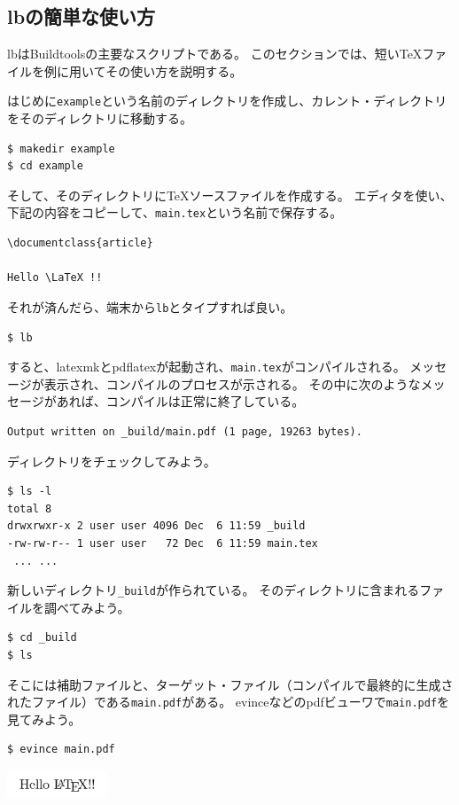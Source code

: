 \subsection{lbの簡単な使い方}
lbはBuildtoolsの主要なスクリプトである。
このセクションでは、短いTeXファイルを例に用いてその使い方を説明する。

はじめに\verb|example|という名前のディレクトリを作成し、カレント・ディレクトリをそのディレクトリに移動する。
\begin{verbatim}
$ makedir example
$ cd example
\end{verbatim}

そして、そのディレクトリにTeXソースファイルを作成する。
エディタを使い、下記の内容をコピーして、\verb|main.tex|という名前で保存する。
\begin{verbatim}
\documentclass{article}

Hello \LaTeX !!

\end{verbatim}

それが済んだら、端末から\verb|lb|とタイプすれば良い。
\begin{verbatim}
$ lb
\end{verbatim}
すると、latexmkとpdflatexが起動され、\verb|main.tex|がコンパイルされる。
メッセージが表示され、コンパイルのプロセスが示される。
その中に次のようなメッセージがあれば、コンパイルは正常に終了している。
\begin{verbatim}
Output written on _build/main.pdf (1 page, 19263 bytes).
\end{verbatim}
ディレクトリをチェックしてみよう。
\begin{verbatim}
$ ls -l
total 8
drwxrwxr-x 2 user user 4096 Dec  6 11:59 _build
-rw-rw-r-- 1 user user   72 Dec  6 11:59 main.tex
 ... ...
\end{verbatim}
新しいディレクトリ\verb|_build|が作られている。
そのディレクトリに含まれるファイルを調べてみよう。
\begin{verbatim}
$ cd _build
$ ls
\end{verbatim}
そこには補助ファイルと、ターゲット・ファイル（コンパイルで最終的に生成されたファイル）である\verb|main.pdf|がある。
evinceなどのpdfビューワで\verb|main.pdf|を見てみよう。
\begin{verbatim}
$ evince main.pdf
\end{verbatim}
\begin{center}
\includegraphics[width=3cm]{hellolatex.png}
\end{center}

